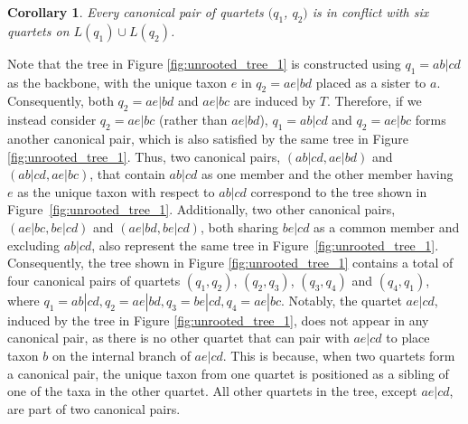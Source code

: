 \documentclass[10pt,a4paper]{article}
\newcommand{\add}[1]{{\color{blue} #1}}
\newtheorem{corollary}{Corollary}[theorem]
\begin{document}

\begin{corollary}
\label{cor:six_conflict}
Every canonical pair of quartets $(q_1$, $q_2)$ is in conflict with six quartets on $L(q_1) \cup L(q_2)$.
\end{corollary}




Note that the tree in Figure \ref{fig:unrooted_tree_1} is constructed using $q_1 = ab|cd$ as the backbone, with the unique taxon $e$ in $q_2 = ae|bd$ placed as a sister to $a$. Consequently, both $q_2 = ae|bd$ and $ae|bc$ are induced by $T$. Therefore, if we instead consider $q_2 = ae|bc$ (rather than $ae|bd$), $q_1 = ab|cd$ and $q_2 = ae|bc$ forms another canonical pair, which is also satisfied by the same tree in Figure \ref{fig:unrooted_tree_1}.
Thus, two canonical pairs, $(ab|cd, ae|bd)$ and $(ab|cd, ae|bc)$, that contain $ab|cd$ as one member and the other member having $e$ as the unique taxon with respect to $ab|cd$ correspond to the tree shown in Figure~\ref{fig:unrooted_tree_1}. Additionally, two other canonical pairs, $(ae|bc, be|cd)$ and $(ae|bd, be|cd)$, both sharing $be|cd$ as a common member and excluding $ab|cd$, also represent the same tree in Figure~\ref{fig:unrooted_tree_1}. Consequently, the tree shown in Figure \ref{fig:unrooted_tree_1} contains a total of four canonical pairs of quartets $(q_1,q_2)$, $(q_2,q_3)$, $(q_3,q_4)$ and $(q_4,q_1)$, where $q_1 = ab|cd, q_2 = ae|bd, q_3= be|cd, q_4 = ae|bc$. Notably, the quartet $ae|cd$, induced by the tree in Figure \ref{fig:unrooted_tree_1}, does not appear in any canonical pair, as there is no other quartet that can pair with $ae|cd$ to place taxon $b$ on the internal branch of $ae|cd$. This is because, when two quartets form a canonical pair, the unique taxon from one quartet is positioned as a sibling of one of the taxa in the other quartet. All other quartets in the tree, except $ae|cd$, are part of two canonical pairs.
\end{document}
